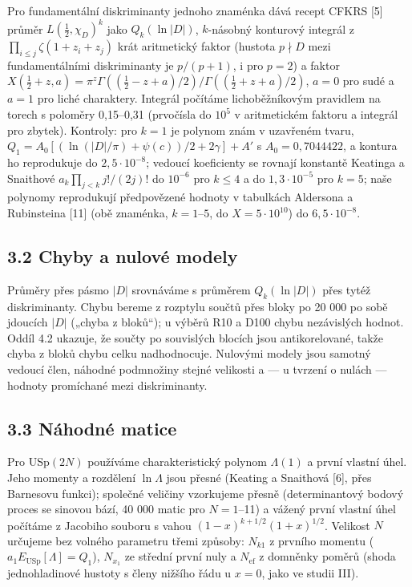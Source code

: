 \documentclass[
  10pt,
]{article}
\begin{document}
Pro fundamentální diskriminanty jednoho znaménka dává recept CFKRS
{[}5{]} průměr \(L(\tfrac12, \chi_D)^k\) jako \(Q_k(\ln|D|)\),
\(k\)-násobný konturový integrál z
\(\prod_{i \le j}\zeta(1 + z_i + z_j)\) krát aritmetický faktor (hustota
\(p \nmid D\) mezi fundamentálními diskriminanty je \(p/(p+1)\), i pro
\(p = 2\)) a faktor
\(X(\tfrac12 + z, a) = \pi^{z}\Gamma((\tfrac12 - z + a)/2)/\Gamma((\tfrac12 + z + a)/2)\),
\(a = 0\) pro sudé a \(a = 1\) pro liché charaktery. Integrál počítáme
lichoběžníkovým pravidlem na torech s poloměry 0,15--0,31 (prvočísla do
\(10^5\) v aritmetickém faktoru a integrál pro zbytek). Kontroly: pro
\(k = 1\) je polynom znám v uzavřeném tvaru,
\(Q_1 = A_0[(\ln(|D|/\pi) + \psi(c))/2 + 2\gamma] + A'\) s
\(A_0 = 0{,}7044422\), a kontura ho reprodukuje do
\(2{,}5\cdot10^{-8}\); vedoucí koeficienty se rovnají konstantě Keatinga
a Snaithové \(a_k\prod_{j<k} j!/(2j)!\) do \(10^{-6}\) pro \(k \le 4\) a
do \(1{,}3\cdot10^{-5}\) pro \(k = 5\); naše polynomy reprodukují
předpovězené hodnoty v tabulkách Aldersona a Rubinsteina {[}11{]} (obě
znaménka, \(k = 1\)--\(5\), do \(X = 5\cdot10^{10}\)) do
\(6{,}5\cdot10^{-8}\).

\hypertarget{chyby-a-nulovuxe9-modely}{%
\subsection{3.2 Chyby a nulové modely}\label{chyby-a-nulovuxe9-modely}}

Průměry přes pásmo \(|D|\) srovnáváme s průměrem \(Q_k(\ln|D|)\) přes
tytéž diskriminanty. Chybu bereme z rozptylu součtů přes bloky po 20 000
po sobě jdoucích \(|D|\) („chyba z bloků``); u výběrů R10 a D100 chybu
nezávislých hodnot. Oddíl 4.2 ukazuje, že součty po souvislých blocích
jsou antikorelované, takže chyba z bloků chybu celku nadhodnocuje.
Nulovými modely jsou samotný vedoucí člen, náhodné podmnožiny stejné
velikosti a --- u tvrzení o nulách --- hodnoty promíchané mezi
diskriminanty.

\hypertarget{nuxe1hodnuxe9-matice}{%
\subsection{3.3 Náhodné matice}\label{nuxe1hodnuxe9-matice}}

Pro USp\((2N)\) používáme charakteristický polynom \(\Lambda(1)\) a
první vlastní úhel. Jeho momenty a rozdělení \(\ln\Lambda\) jsou přesné
(Keating a Snaithová {[}6{]}, přes Barnesovu funkci); společné veličiny
vzorkujeme přesně (determinantový bodový proces se sinovou bází, 40 000
matic pro \(N = 1\)--11) a vážený první vlastní úhel počítáme z Jacobiho
souboru s vahou \((1 - x)^{k + 1/2}(1 + x)^{1/2}\). Velikost \(N\)
určujeme bez volného parametru třemi způsoby: \(N_{k1}\) z prvního
momentu (\(a_1 E_{\mathrm{USp}}[\Lambda] = Q_1\)), \(N_{x_1}\) ze
střední první nuly a \(N_{\mathrm{ef}}\) z domněnky poměrů (shoda
jednohladinové hustoty s členy nižšího řádu u \(x = 0\), jako ve studii
III).
\end{document}
